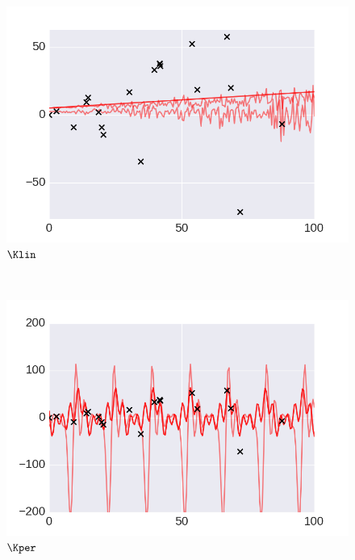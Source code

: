  \begin{subfigure}[b]{0.3\textwidth}
        \includegraphics[width=\textwidth]{figs/composition/composition_demo_LIN.png}
        \caption{$\Klin$}
    \end{subfigure}
    ~ %
    \begin{subfigure}[b]{0.3\textwidth}
        \includegraphics[width=\textwidth]{figs/composition/composition_demo_PER.png}
        \caption{$\Kper$}
    \end{subfigure}
    ~ %
